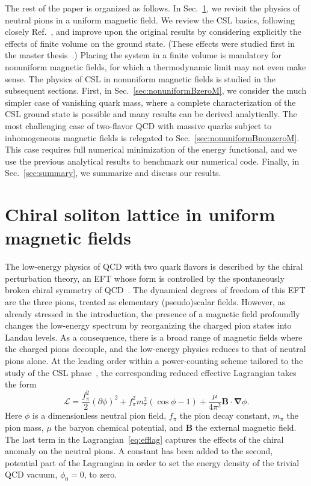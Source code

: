 \documentclass[pdflatex,iicol,sn-mathphys-num]{sn-jnl}
\let\m=\mu
\let\p=\phi
\let\de=\partial
\newcommand{\La}{\mathscr{L}}%
\newcommand{\vek}[1]{\bm{#1}}%
\newcommand{\grad}{\vek\nabla}%
\begin{document}
The rest of the paper is organized as follows. In Sec.~\ref{sec:uniformB}, we revisit the physics of neutral pions in a uniform magnetic field. We review the CSL basics, following closely Ref.~\cite{Brauner:2016pko}, and improve upon the original results by considering explicitly the effects of finite volume on the ground state. (These effects were studied first in the master thesis~\cite{Kar2022}.) Placing the system in a finite volume is mandatory for nonuniform magnetic fields, for which a thermodynamic limit may not even make sense.  The physics of CSL in nonuniform magnetic fields is studied in the subsequent sections. First, in Sec.~\ref{sec:nonuniformBzeroM}, we consider the much simpler case of vanishing quark mass, where a complete characterization of the CSL ground state is possible and many results can be derived analytically. The most challenging case of two-flavor QCD with massive quarks subject to inhomogeneous magnetic fields is relegated to Sec.~\ref{sec:nonuniformBnonzeroM}. This case requires full numerical minimization of the energy functional, and we use the previous analytical results to benchmark our numerical code. Finally, in Sec.~\ref{sec:summary}, we summarize and discuss our results.


\section{Chiral soliton lattice in uniform magnetic fields}
\label{sec:uniformB}

The low-energy physics of QCD with two quark flavors is described by the chiral perturbation theory, an EFT whose form is controlled by the spontaneously broken chiral symmetry of QCD~\cite{Scherer2012a}. The dynamical degrees of freedom of this EFT are the three pions, treated as elementary (pseudo)scalar fields. However, as already stressed in the introduction, the presence of a magnetic field profoundly changes the low-energy spectrum by reorganizing the charged pion states into Landau levels. As a consequence, there is a broad range of magnetic fields where the charged pions decouple, and the low-energy physics reduces to that of neutral pions alone. At the leading order within a power-counting scheme tailored to the study of the CSL phase~\cite{Brauner:2021sci}, the corresponding reduced effective Lagrangian takes the form
\begin{equation}
\La=\frac{f_\pi^2}{2}(\de\p)^2+f_\pi^2m_\pi^2(\cos\p-1)+\frac\m{4\pi^2}\vek B\cdot\grad\p.
\label{eq:efflag}
\end{equation}
Here $\p$ is a dimensionless neutral pion field, $f_\pi$ the pion decay constant, $m_\pi$ the pion mass, $\m$ the baryon chemical potential, and $\vek B$ the external magnetic field. The last term in the Lagrangian~\eqref{eq:efflag} captures the effects of the chiral anomaly on the neutral pions. A constant has been added to the second, potential part of the Lagrangian in order to set the energy density of the trivial QCD vacuum, $\p_0=0$, to zero.
\end{document}
